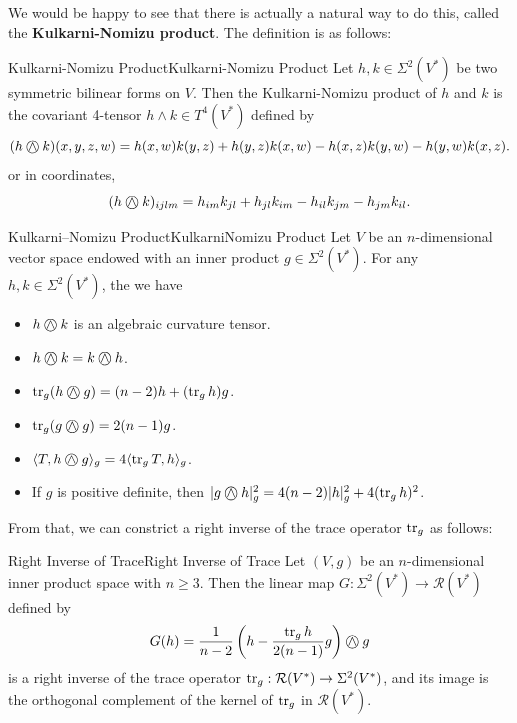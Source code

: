 \documentclass[../main.tex]{subfiles}
\begin{document}
We would be happy to see that there is actually a natural way to do this, called the \textbf{Kulkarni-Nomizu product}. The definition is as follows:
\begin{definition}{Kulkarni-Nomizu Product}{Kulkarni-Nomizu Product}
	Let $h, k \in \Sigma^2(V^*)$ be two symmetric bilinear forms on $V$. Then the Kulkarni-Nomizu product of $h$ and $k$ is the covariant 4-tensor $h \wedge k \in T^4(V^*)$ defined by
	\begin{equation}
		(h \owedge k)(x, y, z, w) = h(x, w) k(y, z) + h(y, z) k(x, w) - h(x, z) k(y, w) - h(y, w) k(x, z).
	\end{equation}
	or in coordinates,
	\begin{equation*}
		(h \owedge k)_{ijlm} = h_{im} k_{jl} + h_{jl} k_{im} - h_{il} k_{jm} - h_{jm} k_{il}.
	\end{equation*}
\end{definition}

\begin{lemma}{Kulkarni–Nomizu Product}{KulkarniNomizu Product}
	Let $V$ be an $n$-dimensional vector space endowed with an inner product $g \in \Sigma^2(V^*)$. For any $h, k \in \Sigma^2(V^*)$, the we have
	\begin{itemize}
		\item $h \owedge k$ is an algebraic curvature tensor.
		\item $h \owedge k = k \owedge h$.
		\item $\tr_g(h \owedge g) = (n-2) h + (\tr_g h) g$.
		\item $\tr_g(g \owedge g) = 2(n-1) g$.
		\item $\langle T, h \owedge g \rangle_g = 4 \langle \tr_g T, h \rangle_g$.
		\item If $g$ is positive definite, then $|g \owedge h|_g^2 = 4(n-2) |h|_g^2 + 4 (\tr_g h)^2$.
	\end{itemize}
\end{lemma}

From that, we can constrict a right inverse of the trace operator $\operatorname{tr}_g$ as follows:
\begin{proposition}{Right Inverse of Trace}{Right Inverse of Trace}
	Let $(V, g)$ be an $n$-dimensional inner product space with $n \geq 3$. Then the linear map $G: \Sigma^2(V^*) \to \mathcal{R}(V^*)$ defined by
	\begin{equation}
		G(h) = \frac{1}{n-2} \left( h - \frac{\tr_g h}{2(n-1)} g \right) \owedge g
	\end{equation}
	is a right inverse of the trace operator $\operatorname{tr}_g: \mathcal{R}(V^*) \to \Sigma^2(V^*)$, and its image is the orthogonal complement of the kernel of $\operatorname{tr}_g$ in $\mathcal{R}(V^*)$.
\end{proposition}
\end{document}

